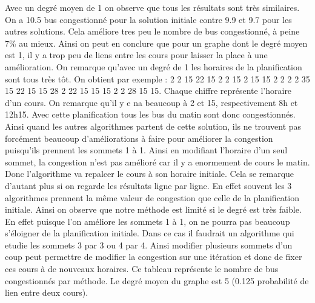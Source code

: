 \documentclass[a4paper,11pt]{article}
\begin{document}
	Avec un degré moyen de 1 on observe que tous les résultats sont très similaires. On a 10.5 bus congestionné pour la solution initiale contre 9.9 et 9.7 pour les autres solutions. Cela améliore tres peu le nombre de bus congestionné, à peine 7\% au mieux. Ainsi on peut en conclure que pour un graphe dont le degré moyen est 1, il y a trop peu de liens entre les cours pour laisser la place à une amélioration. On remarque qu'avec un degré de 1 les horaires de la planification sont tous très tôt. On obtient par exemple : 2  2  15  22  15  2  2  15  2  15  15  2  2  2  2  35  15  22  15  15  28  2  22  15  15  15  2  2  28  15  15. Chaque chiffre représente l'horaire d'un cours. On remarque qu'il y e na beaucoup à 2 et 15, respectivement 8h et 12h15. Avec cette planification tous les bus du matin sont donc congestionnés. Ainsi quand les autres algorithmes partent de cette solution, ils ne trouvent pas forcément beaucoup d'améliorations à faire pour améliorer la congestion puisqu'ils prennent les sommets 1 à 1. Ainsi en modifiant l'horaire d'un seul sommet, la congestion n'est pas amélioré car il y a enormement de cours le matin. Donc l'algorithme va repalcer le cours à son horaire initiale. Cela se remarque d'autant plus si on regarde les résultats ligne par ligne. En effet souvent les 3 algorithmes prennent la même valeur de congestion que celle de la planification initiale. Ainsi on observe que notre méthode est limité si le degré est très faible. En effet puisque l'on améliore les sommets 1 à 1, on ne pourra pas beaucoup s'éloigner de la planification initiale. Dans ce cas il faudrait un algorithme qui etudie les sommets 3 par 3 ou 4 par 4. Ainsi modifier plusieurs sommets d'un coup peut permettre de modifier la congestion sur une itération et donc de fixer ces cours à de nouveaux horaires.
	\newpage
	Ce tableau représente le nombre de bus congestionnés par méthode. Le degré moyen du graphe est 5 (0.125 probabilité de lien entre deux cours).\\ 
\end{document}
